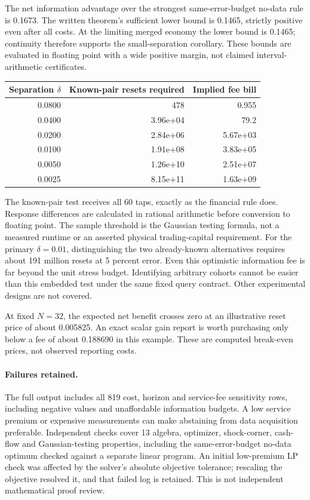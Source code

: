 The net information advantage over the strongest same-error-budget no-data rule is 0.1673. The written theorem's sufficient lower bound is 0.1465, strictly positive even after all costs. At the limiting merged economy the lower bound is 0.1465; continuity therefore supports the small-separation corollary. These bounds are evaluated in floating point with a wide positive margin, not claimed interval-arithmetic certificates.
\begin{center}\small\begin{tabular}{rrr}
\toprule
Separation $\delta$ & Known-pair resets required & Implied fee bill\\
\midrule
0.0800 & 478 & 0.955\\
0.0400 & 3.96e+04 & 79.2\\
0.0200 & 2.84e+06 & 5.67e+03\\
0.0100 & 1.91e+08 & 3.83e+05\\
0.0050 & 1.26e+10 & 2.51e+07\\
0.0025 & 8.15e+11 & 1.63e+09\\
\bottomrule\end{tabular}\end{center}
The known-pair test receives all 60 taps, exactly as the financial rule does.
Response differences are calculated in rational arithmetic before conversion
to floating point. The sample threshold is the Gaussian testing formula, not
a measured runtime or an asserted physical trading-capital requirement.
For the primary $\delta=0.01$, distinguishing the two already-known
alternatives requires about 191 million resets at 5 percent error. Even
this optimistic information fee is far beyond the unit stress budget.
Identifying arbitrary cohorts cannot be easier than this embedded test under
the same fixed query contract. Other experimental designs are not covered.

At fixed $N=32$, the expected net benefit crosses zero at an illustrative reset price of about 0.005825. An exact scalar gain report is worth purchasing only below a fee of about 0.188690 in this example. These are computed break-even prices, not observed reporting costs.
\paragraph{Failures retained.}
The full output includes all 819 cost, horizon and service-fee sensitivity
rows, including negative values and unaffordable information budgets.
A low service premium or expensive measurements can make abstaining from
data acquisition preferable. Independent checks cover 13 algebra, optimizer,
shock-corner, cash-flow and Gaussian-testing properties, including the
same-error-budget no-data optimum checked against a separate linear program.
An initial low-premium LP check was affected by the solver's absolute
objective tolerance; rescaling the objective resolved it, and that failed
log is retained. This is not independent mathematical proof review.

